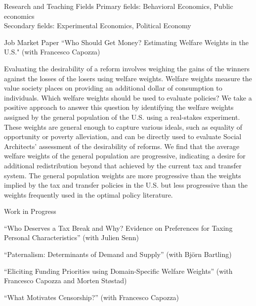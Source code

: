 \documentclass{resume} %
\begin{document}
\begin{rSection}{Research and Teaching Fields}
  Primary fields: Behavioral Economics, Public economics \\
  Secondary fields: Experimental Economics, Political Economy
\end{rSection}


\begin{rSection}{Job Market Paper}
    ``Who Should Get Money? Estimating Welfare Weights in the U.S." (with Francesco Capozza) 

    Evaluating the desirability of a reform involves weighing the gains of the winners against the losses of the losers using welfare weights. Welfare weights measure the value society places on providing an additional dollar of consumption to individuals. Which welfare weights should be used to evaluate policies? We take a positive approach to answer this question by identifying the welfare weights assigned by the general population of the U.S. using a real-stakes experiment. These weights are general enough to capture various ideals, such as equality of opportunity or poverty alleviation, and can be directly used to evaluate Social Architects' assessment of the desirability of reforms. We find that the average welfare weights of the general population are progressive, indicating a desire for additional redistribution beyond that achieved by the current tax and transfer system. The general population weights are more progressive than the weights implied by the tax and transfer policies in the U.S. but less progressive than the weights frequently used in the optimal policy literature.
\end{rSection}


\begin{rSection}{Work in Progress}
  
  ``Who Deserves a Tax Break and Why? Evidence on
   Preferences for Taxing Personal Characteristics” (with Julien Senn) 

  ``Paternalism: Determinants of Demand and Supply” (with Bj\"{o}rn Bartling)

  ``Eliciting Funding Priorities using Domain-Specific Welfare Weights” (with Francesco Capozza and Morten St{\o}stad)

  ``What Motivates Censorship?” (with Francesco Capozza)
\end{rSection}
\end{document}
